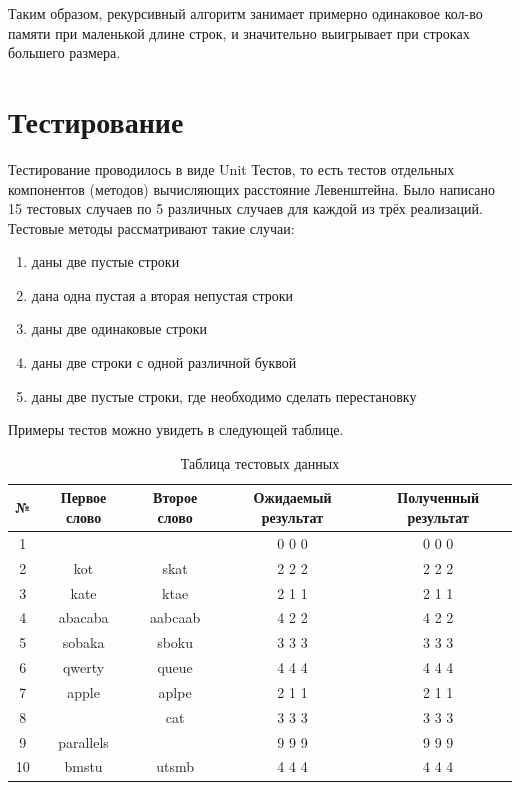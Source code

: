 \documentclass[12pt]{report}
\begin{document}
\par
Таким образом, рекурсивный алгоритм занимает примерно одинаковое кол-во памяти при маленькой длине строк, и значительно выигрывает при строках большего размера.


\section{Тестирование}

\par
Тестирование проводилось в виде Unit Тестов, то есть тестов отдельных компонентов (методов) вычисляющих расстояние Левенштейна.
Было написано 15 тестовых случаев по 5 различных случаев для каждой из трёх реализаций. Тестовые методы рассматривают такие случаи:
\begin{enumerate}
  	\item даны две пустые строки
	\item дана одна пустая а вторая непустая строки
	\item даны две одинаковые строки
	\item даны две строки с одной различной буквой
	\item даны две пустые строки, где необходимо сделать перестановку
\end{enumerate}
Примеры тестов можно увидеть в следующей таблице.

\begin{table} [h!]
\caption{Таблица тестовых данных}
	\begin{tabular}{|c c c c c|} 
 	\hline
	№ & Первое слово & Второе слово & Ожидаемый результат & Полученный результат \\ [0.8ex] 
 	\hline\hline
 	1 &  &  & 0 0 0 & 0 0 0\\
 	\hline
 	2 & kot & skat & 2 2 2 & 2 2 2\\
 	\hline
	3 & kate & ktae & 2 1 1 & 2 1 1\\
	\hline
	4 & abacaba & aabcaab & 4 2 2 & 4 2 2\\
	\hline
	5 & sobaka & sboku & 3 3 3 & 3 3 3\\
	\hline
	6 & qwerty & queue & 4 4 4 & 4 4 4\\
	\hline
	7 & apple & aplpe & 2 1 1  & 2 1 1\\
	\hline
	8 &  & cat & 3 3 3 & 3 3 3\\
	\hline
	9 & parallels &  & 9 9 9 & 9 9 9\\
	\hline
	10 & bmstu & utsmb & 4 4 4 & 4 4 4\\
	\hline
	\end{tabular}
\end{table}
\end{document}

